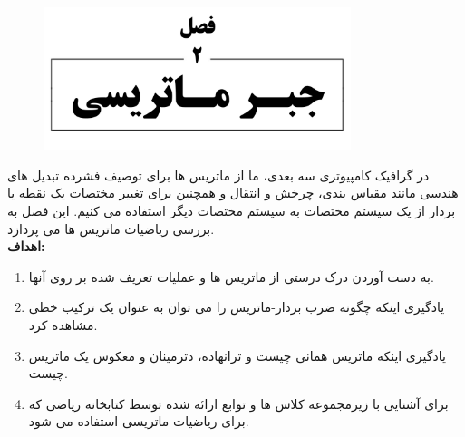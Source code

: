 \newpage

\setcounter{chapter}{2}
\setcounter{example}{0}
\setcounter{eqtn}{0}
\setcounter{section}{0}


\chapter{}
\textbf{\vspace{-140pt}}
\begin{figure}[H]
    \centering
    \setlength{\belowcaptionskip}{-10pt}
    \includegraphics[width=0.8\textwidth]{Images/4/2/4.Session.1.2.0}
    \label{fig:4.Session.1.2.0}
\end{figure}
\textbf{\vspace{20pt}}
{
    \Large
    \begin{spacing}{1.5}
        در گرافیک کامپیوتری سه بعدی، ما از ماتریس ها برای توصیف فشرده تبدیل های هندسی مانند مقیاس بندی، چرخش و انتقال و همچنین برای تغییر مختصات یک نقطه یا بردار از یک سیستم مختصات به سیستم مختصات دیگر استفاده می کنیم.
        این فصل به بررسی ریاضیات ماتریس ها می پردازد.
        \\

        \textbf{\LARGE \hspace{-40pt}اهداف:}
        \begin{enumerate}[label=\textbf{\arabic*}.]
            \item {به دست آوردن درک درستی از ماتریس ها و عملیات تعریف شده بر روی آنها.}
            \item {یادگیری اینکه چگونه ضرب بردار-ماتریس را می توان به عنوان یک ترکیب خطی مشاهده کرد.}
            \item {یادگیری اینکه ماتریس همانی چیست و ترانهاده، دترمینان و معکوس یک ماتریس چیست.}
            \item {برای آشنایی با زیرمجموعه کلاس ها و توابع ارائه شده توسط کتابخانه ریاضی  که برای ریاضیات ماتریسی استفاده می شود.}
        \end{enumerate}
    \end{spacing}
}
\newpage


